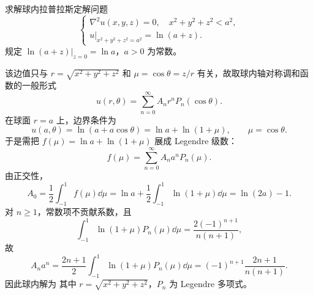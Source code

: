\begin{question}[第3题]

求解球内拉普拉斯定解问题
\[
\begin{cases}
\nabla^{2} u(x, y, z)=0,\quad x^2+y^2+z^2<a^2,\\
\left.u\right|_{x^2+y^2+z^2=a^2}=\ln(a+z).
\end{cases}
\]
规定 $\ln(a+z)\big|_{z=0}=\ln a$，$a>0$ 为常数。

\begin{solution}

该边值只与 $r=\sqrt{x^2+y^2+z^2}$ 和 $\mu=\cos\theta=z/r$ 有关，故取球内轴对称调和函数的一般形式
\[
u(r,\theta)=\sum_{n=0}^{\infty}A_n r^n P_n(\cos\theta).
\]
在球面 $r=a$ 上，边界条件为
\[
u(a,\theta)=\ln(a+a\cos\theta)=\ln a+\ln(1+\mu),\qquad \mu=\cos\theta.
\]
于是需把 $f(\mu)=\ln a+\ln(1+\mu)$ 展成 Legendre 级数：
\[
f(\mu)=\sum_{n=0}^{\infty}A_n a^n P_n(\mu).
\]
由正交性，
\[
A_0=\frac12\int_{-1}^1 f(\mu)\dd{\mu}
=\ln a+\frac12\int_{-1}^1\ln(1+\mu)\dd{\mu}
=\ln(2a)-1.
\]
对 $n\ge 1$，常数项不贡献系数，且
\[
\int_{-1}^1\ln(1+\mu)P_n(\mu)\dd{\mu}
=\frac{2(-1)^{n+1}}{n(n+1)},
\]
故
\[
A_n a^n
=\frac{2n+1}{2}\int_{-1}^1\ln(1+\mu)P_n(\mu)\dd{\mu}
=(-1)^{n+1}\frac{2n+1}{n(n+1)}.
\]
因此球内解为
其中 $r=\sqrt{x^2+y^2+z^2}$，$P_n$ 为 Legendre 多项式。

\end{solution}
\end{question}

